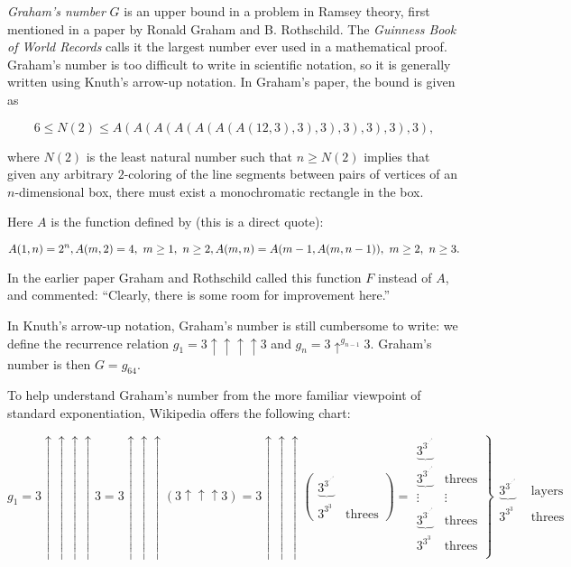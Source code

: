 \documentclass[12pt]{article}
\begin{document}
{\em Graham's number} $G$ is an upper bound in a problem in Ramsey theory, first mentioned in a paper by Ronald Graham and B. Rothschild. The {\it Guinness Book of World Records} calls it the largest number ever used in a mathematical proof. Graham's number is too difficult to write in scientific notation, so it is generally written using Knuth's arrow-up notation. In Graham's paper, the bound is given as

\[
6 \le N(2) \le
A(A(A(A(A(A(A(12,3),3),3),3),3),3),3),
\]

where $N(2)$ is the least natural number such that $n\ge N(2)$ implies that given any arbitrary $2$-coloring of the line segments between pairs of vertices of an $n$-dimensional box, there must exist a monochromatic rectangle in the box.

Here $A$ is the function defined by (this is a direct quote):

\[
A(1,n) = 2^n, A(m,2) = 4,\ m\ge 1,\ n\ge 2, \\
A(m,n) = A(m-1, A(m, n-1)),\ m\ge 2,\ n\ge 3.
\]

In the earlier paper Graham and Rothschild called this function $F$ instead of $A$, and commented: ``Clearly, there is some room for improvement here.''

In Knuth's arrow-up notation, Graham's number is still cumbersome to write: we define the recurrence relation $g_1 = 3 \uparrow \uparrow \uparrow \uparrow 3$ and $g_n = 3\uparrow^{g_{n - 1}}3$. Graham's number is then $G = g_{64}$.

To help understand Graham's number from the more familiar viewpoint of standard exponentiation, Wikipedia offers the following chart:

$$ 
g_1 
= 3 \uparrow \uparrow \uparrow \uparrow 3 
= 3 \uparrow \uparrow \uparrow (3 \uparrow \uparrow \uparrow 3) 
= 3 \uparrow \uparrow \uparrow 
  \left( 
    \begin{matrix} 
      \underbrace{3^{3^{\cdot^{\cdot^{\cdot^{3}}}}}} & \  \\ 
      3^{3^3} & \text{threes} 
    \end{matrix}
  \right)
= \left.
    \begin{matrix}
      \underbrace{3^{3^{\cdot^{\cdot^{\cdot^{3}}}}}} & \  \\
      \underbrace{3^{3^{\cdot^{\cdot^{\cdot^{3}}}}}} & \text{threes} \\
      \vdots & \vdots \\
      \underbrace{3^{3^{\cdot^{\cdot^{\cdot^{3}}}}}} & \text{threes}  \\
      3^{3^3} & \text{threes} \\
    \end{matrix}
  \right \}
  \begin{matrix}
    \ & \ \\
    \underbrace{3^{3^{\cdot^{\cdot^{\cdot^{3}}}}}} & \mbox{ layers} \\ 
    3^{3^3} & \text{ threes}
  \end{matrix} 
$$
\end{document}
